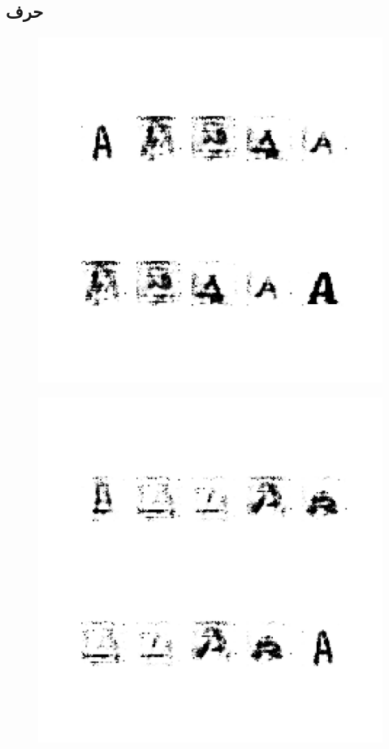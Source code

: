 \documentclass{article}
\begin{document}
\subsection{حرف }
\begin{figure}[H]
	\centerline{\includegraphics[width=\textwidth , height=\textheight ]{../results/CGAN_Adam/figs/letters/A/95.pdf}}
\end{figure}
\begin{figure}[H]
	\centerline{\includegraphics[width=\textwidth , height=\textheight ]{../results/CGAN_Adam/figs/letters/A/90.pdf}}
\end{figure}
\end{document}
